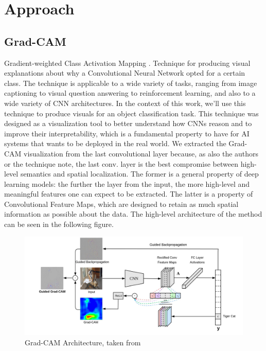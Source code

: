\documentclass[../main.tex]{subfiles}
\begin{document}
    \chapter{Approach}

    \section{Grad-CAM}
    Gradient-weighted Class Activation Mapping \cite{gradcam}. Technique for producing visual explanations
    about why a Convolutional Neural Network opted for a certain class. The technique is applicable to a wide
    variety of tasks, ranging from image captioning to visual question answering to reinforcement learning, and
    also to a wide variety of CNN architectures. In the context of this work, we'll use this technique to
    produce visuals for an object classification task.
    This technique was designed as a visualization tool to better understand how CNNs reason and to improve
    their interpretability, which is a fundamental property to have for AI systems that wants to be deployed
    in the real world.
    We extracted the Grad-CAM visualization from the last convolutional layer because, as also the authors
    or the technique note, the last conv. layer is the best compromise between high-level semantics and spatial
    localization. The former is a general property of deep learning models: the further the layer from the input,
    the more high-level and meaningful features one can expect to be extracted. The latter is a property of
    Convolutional Feature Maps, which are designed to retain as much spatial information as possible about
    the data.
    The high-level architecture of the method can be seen in the following figure.

	\begin{figure}[h!]
    	\includegraphics[width=\linewidth]{img/gradcam-architecture.png}
	    \caption{Grad-CAM Architecture, taken from \cite{gradcam}}
    	\label{fig:gradcam-architecture}
	\end{figure}
\end{document}
